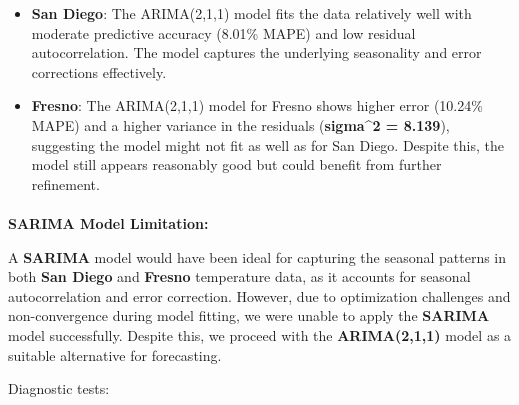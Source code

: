 \documentclass[
  11pt,
]{article}
\makeatletter
\let\oldparagraph\paragraph
\renewcommand{\paragraph}{
    \@ifstar
      \xxxParagraphStar
      \xxxParagraphNoStar
  }
\newcommand{\xxxParagraphStar}[1]{\oldparagraph*{#1}\mbox{}}
\newcommand{\xxxParagraphNoStar}[1]{\oldparagraph{#1}\mbox{}}
\makeatother
\begin{document}
\begin{itemize}
\item
  \textbf{San Diego}: The ARIMA(2,1,1) model fits the data relatively
  well with moderate predictive accuracy (8.01\% MAPE) and low residual
  autocorrelation. The model captures the underlying seasonality and
  error corrections effectively.
\item
  \textbf{Fresno}: The ARIMA(2,1,1) model for Fresno shows higher error
  (10.24\% MAPE) and a higher variance in the residuals
  (\textbf{sigma\^{}2 = 8.139}), suggesting the model might not fit as
  well as for San Diego. Despite this, the model still appears
  reasonably good but could benefit from further refinement.
\end{itemize}

\paragraph{\texorpdfstring{\textbf{SARIMA Model
Limitation:}}{SARIMA Model Limitation:}}\label{sarima-model-limitation}

A \textbf{SARIMA} model would have been ideal for capturing the seasonal
patterns in both \textbf{San Diego} and \textbf{Fresno} temperature
data, as it accounts for seasonal autocorrelation and error correction.
However, due to optimization challenges and non-convergence during model
fitting, we were unable to apply the \textbf{SARIMA} model successfully.
Despite this, we proceed with the \textbf{ARIMA(2,1,1)} model as a
suitable alternative for forecasting.

Diagnostic tests:
\end{document}
